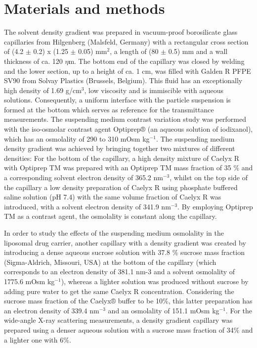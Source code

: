 \section{Materials and methods}
The solvent density gradient was prepared in vacuum-proof borosilicate glass capillaries from Hilgenberg (Malsfeld, Germany) with a rectangular cross section of (4.2 $\pm$ 0.2) x (1.25 $\pm$ 0.05) mm$^2$, a length of (80 $\pm$ 0.5) mm and a wall thickness of ca. 120 $\eta$m. The bottom end of the capillary was closed by welding and the lower section, up to a height of ca. 1 cm, was filled with Galden R PFPE SV90 from Solvay Plastics (Brussels, Belgium). This fluid has an exceptionally high density of 1.69 g/cm$^3$, low viscosity and is immiscible with aqueous solutions. Consequently, a uniform interface with the particle suspension is formed at the bottom which serves as reference for the transmittance measurements. The suspending medium contrast variation study was performed with the iso-osmolar contrast agent Optiprep® (an aqueous solution of iodixanol), which has an osmolality of 290 to 310 mOsm kg$^{-1}$. The suspending medium density gradient was achieved by bringing together two mixtures of different densities: For the bottom of the capillary, a high density mixture of Caelyx R with Optiprep TM was prepared with an Optiprep TM mass fraction of 35 $\%$ and a corresponding solvent electron density of 365.2 nm$^{-3}$, whilst on the top side of the capillary a low density preparation of Caelyx R  using phosphate buffered saline solution (pH 7.4) with the same volume fraction of Caelyx R was introduced, with a solvent electron density of 341.9 nm$^{-3}$. By employing Optiprep TM as a contrast agent, the osmolality is constant along the capillary. 

In order to study the effects of the suspending medium osmolality in the liposomal drug carrier, another capillary with a density gradient was created by introducing a dense aqueous sucrose solution with 37.8 $\%$ sucrose mass fraction (Sigma-Aldrich, Missouri, USA) at the bottom of the capillary (which corresponds to an electron density of 381.1 nm-3 and a solvent osmolality of 1775.6 mOsm kg$^{-1}$), whereas a lighter solution was produced without sucrose by adding pure water to get the same Caelyx R concentration. Considering the sucrose mass fraction of the Caelyx® buffer to be 10$\%$, this latter preparation has an electron density of 339.4 nm$^{-3}$ and an osmolality of 151.1 mOsm kg$^{-1}$. For the wide-angle X-ray scattering measurements, a density gradient capillary was prepared using a denser aqueous solution with a sucrose mass fraction of 34$\%$ and a lighter one with 6$\%$.

